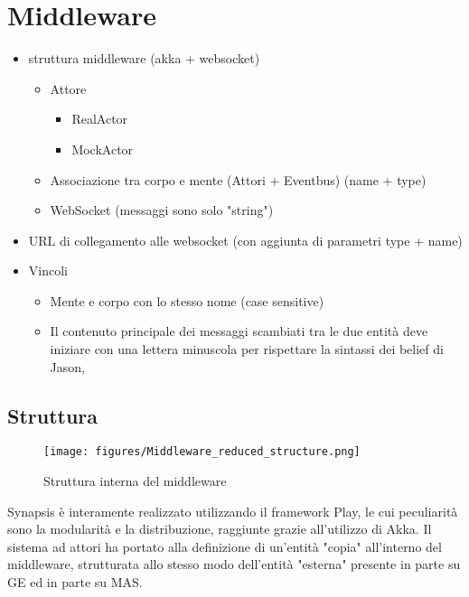 \section{Middleware}
\begin{itemize}
   \item struttura middleware (akka + websocket)
   \begin{itemize}
      \item Attore
      \begin{itemize}
         \item RealActor
         \item MockActor
      \end{itemize}
      \item Associazione tra corpo e mente (Attori + Eventbus) (name + type)
      \item WebSocket (messaggi sono solo "string")
   \end{itemize}
   \item URL di collegamento alle websocket (con aggiunta di parametri type + name)
   \item Vincoli
   \begin{itemize}
      \item Mente e corpo con lo stesso nome (case sensitive)
      \item Il contenuto principale dei messaggi scambiati tra le due entità deve iniziare con una lettera minuscola per rispettare la sintassi dei belief di Jason,
   \end{itemize}
\end{itemize}

\subsection{Struttura}

\begin{figure}[H]
\centering
\texttt{[image: figures/Middleware\_reduced\_structure.png]}
\caption{Struttura interna del middleware}
\end{figure}

Synapsis è interamente realizzato utilizzando il framework Play, %
le cui peculiarità sono la modularità e la distribuzione, raggiunte grazie all'utilizzo di Akka. Il sistema ad attori ha portato alla definizione di un'entità "copia" all'interno del middleware, strutturata allo stesso modo dell'entità "esterna" presente in parte su GE ed in parte su MAS.

